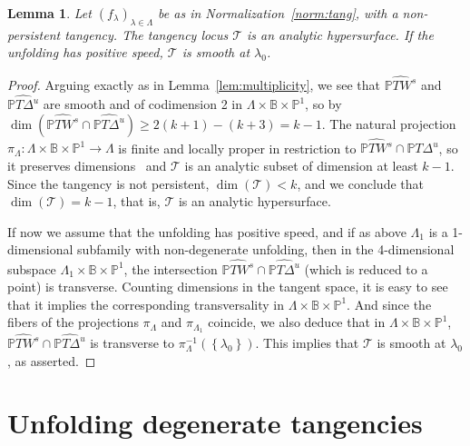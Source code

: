 \documentclass[11pt, oneside]{amsart}
\newcommand{\B}{\mathbb{B}}
\renewcommand{\P}{\mathbb{P}}
\newcommand{\set}[1]{\left\{#1\right\}}
\newcommand{\pu}{{\mathbb{P}^1}}
\newcommand{\la}{\lambda}
\newcommand{\lo}{{\lambda_0}}
\newcommand{\inv}{^{-1}}
\newtheorem{lem}[prop] {Lemma}
\theoremstyle{remark}
\theoremstyle{definition}
\theoremstyle{theorem}
\begin{document}
 
 \begin{lem}\label{lem:higherdim}
 Let $(f_\lambda)_{\lambda\in \Lambda}$ 
 be as in Normalization~\ref{norm:tang}, with a non-persistent tangency. 
 The tangency locus $\mathcal T$ is an analytic hypersurface. If the unfolding has positive speed, 
 $\mathcal T$ is smooth at $\lo$.  
 \end{lem}
  
\begin{proof}
 Arguing exactly as in Lemma~\ref{lem:multiplicity}, we see that 
$\widehat{\P TW^s}$ and  $\widehat{\P T\Delta^u}$ are smooth and of codimension 2 in 
$\Lambda\times \B\times \P^1$, so by~\cite[\S 3.5]{chirka} 
 $\dim (\widehat{\P TW^s}\cap \widehat{\P T\Delta^u})\geq 2(k+1) - (k+3) = k-1$.  
The natural projection 
$\pi_\Lambda:\Lambda\times \B\times \P^1\to \Lambda$ is finite and locally proper in restriction to 
$\widehat{\P TW^s}\cap \widehat{\P T\Delta^u}$, so 
it preserves  dimensions~\cite[\S 3.3]{chirka} and $\mathcal T$ is an analytic subset of dimension 
at least $k-1$. 
Since the tangency is not persistent, $\dim(\mathcal T)<k$, and we conclude that 
$\dim(\mathcal T)= k-1$, that is, 
 {$\mathcal T$ is an analytic  hypersurface}. 


If  now we assume that the unfolding has positive speed, and  
if as above $\Lambda_1$ is a 1-dimensional subfamily with non-degenerate unfolding, then
in the 4-dimensional subspace 
 $\Lambda_1\times \B\times \pu$, the 
 intersection $\widehat{\P TW^s}\cap \widehat{\P T\Delta^u}$ 
 (which is reduced to a point) is transverse. 
 Counting dimensions in the tangent space, it is easy to see that 
 it implies the corresponding transversality in  $\Lambda\times \B\times \pu$. And since 
 the fibers of the projections $\pi_{\Lambda}$ and $\pi_{\Lambda_1}$ coincide, we also deduce that 
 in $\Lambda\times \B\times \pu$, $\widehat{\P TW^s}\cap \widehat{\P T\Delta^u}$ is transverse to 
 $\pi_\Lambda\inv(\set{\lo})$. This implies  that %
 $\mathcal T$  is smooth at $\lo$, as asserted.
 \end{proof} 

\section{Unfolding degenerate tangencies}\label{sec:quadratic}
\end{document}

